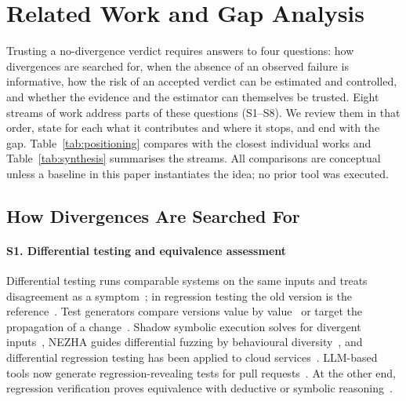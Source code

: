 \section{Related Work and Gap Analysis}\label{sec:background}

Trusting a no-divergence verdict requires answers to four questions: how divergences are searched for, when the absence of an observed failure is informative, how the risk of an accepted verdict can be estimated and controlled, and whether the evidence and the estimator can themselves be trusted. Eight streams of work address parts of these questions (S1--S8). We review them in that order, state for each what it contributes and where it stops, and end with the gap. Table~\ref{tab:positioning} compares \sbg{} with the closest individual works and Table~\ref{tab:synthesis} summarises the streams. All comparisons are conceptual unless a baseline in this paper instantiates the idea; no prior tool was executed.

\subsection{How Divergences Are Searched For}
\paragraph*{S1. Differential testing and equivalence assessment} Differential testing runs comparable systems on the same inputs and treats disagreement as a symptom~\cite{mckeeman1998differential}; in regression testing the old version is the reference~\cite{evans2007differential}. Test generators compare versions value by value~\cite{jin2010automated,taneja2008diffgen} or target the propagation of a change~\cite{santelices2008testsuite}. Shadow symbolic execution solves for divergent inputs~\cite{cadar2014shadow,palikareva2016shadow,kuchta2018shadow}, NEZHA guides differential fuzzing by behavioural diversity~\cite{petsios2017nezha}, and differential regression testing has been applied to cloud services~\cite{godefroid2020differential}. LLM-based tools now generate regression-revealing tests for pull requests~\cite{pradel2026testora,hu2026difftestgen,lecong2026patchguru,fu2026orion,etemadi2025mokav,liu2026evaluating,schafer2024empirical}. At the other end, regression verification proves equivalence with deductive or symbolic reasoning~\cite{godlin2009regression,lahiri2012symdiff,felsing2014automating,malik2021automatically}.

